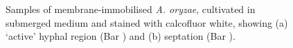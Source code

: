 \begin{figure}[htbp]
	\centering
	\hspace{0.5cm}
	\caption{Samples of membrane-immobilised \emph{A. oryzae}, cultivated in submerged medium and stained with calcofluor white, showing (a) \lq active' hyphal region (Bar ) and (b) septation (Bar ).}
	\label{fig:CFWHiMag}
\end{figure}